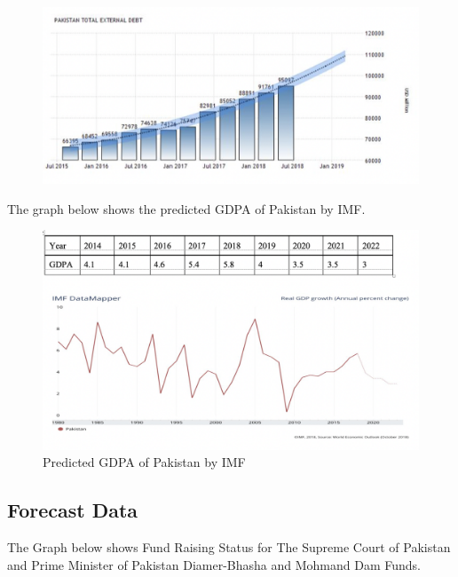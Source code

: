 \documentclass[11pt, journal,letterpaper,compsoc]{IEEEtran}
\begin{document}
\begin{figure}  [h!]
\includegraphics[width=\linewidth]{images/predicted-gdpa}

\end{figure}

The graph below shows the predicted GDPA of Pakistan by IMF. \\
\begin{figure}  [h!]
\includegraphics[width=\linewidth]{images/gdpa-imf}
 \caption{Predicted GDPA of Pakistan by IMF}
\end{figure}

\subsection{Forecast Data}

The Graph below  shows Fund Raising Status for The Supreme Court of Pakistan and Prime Minister of Pakistan Diamer-Bhasha and Mohmand Dam Funds.\\ 
\end{document}
